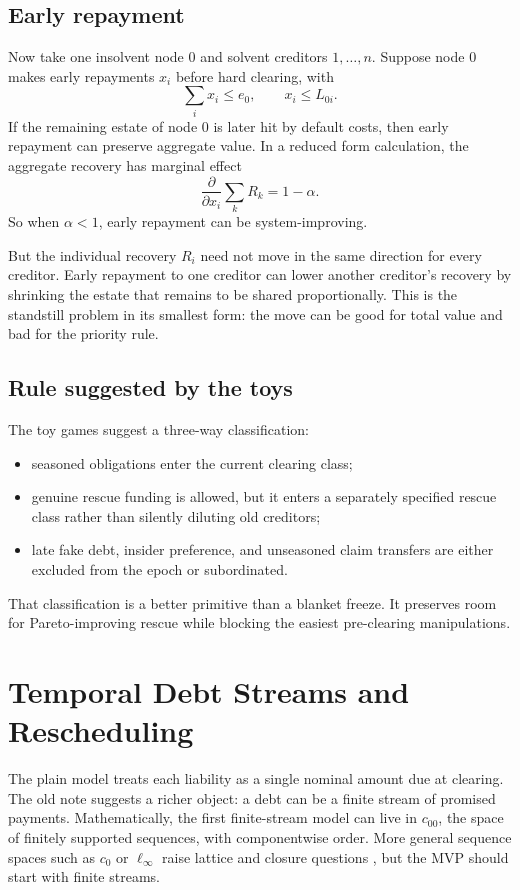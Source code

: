 \documentclass[11pt,oneside]{article}
\begin{document}
\subsection{Early repayment}

Now take one insolvent node $0$ and solvent creditors $1,\ldots,n$. Suppose
node $0$ makes early repayments $x_i$ before hard clearing, with
\[
  \sum_i x_i\leq e_0,\qquad x_i\leq L_{0i}.
\]
If the remaining estate of node $0$ is later hit by default costs, then early
repayment can preserve aggregate value. In a reduced form calculation, the
aggregate recovery has marginal effect
\[
  \frac{\partial}{\partial x_i}\sum_k R_k = 1-\alpha.
\]
So when $\alpha<1$, early repayment can be system-improving.

But the individual recovery $R_i$ need not move in the same direction for every
creditor. Early repayment to one creditor can lower another creditor's recovery
by shrinking the estate that remains to be shared proportionally. This is the
standstill problem in its smallest form: the move can be good for total value
and bad for the priority rule.

\subsection{Rule suggested by the toys}

The toy games suggest a three-way classification:

\begin{itemize}[leftmargin=1.5em]
  \item seasoned obligations enter the current clearing class;
  \item genuine rescue funding is allowed, but it enters a separately specified
  rescue class rather than silently diluting old creditors;
  \item late fake debt, insider preference, and unseasoned claim transfers are
  either excluded from the epoch or subordinated.
\end{itemize}

That classification is a better primitive than a blanket freeze. It preserves
room for Pareto-improving rescue while blocking the easiest pre-clearing
manipulations.

\section{Temporal Debt Streams and Rescheduling}

The plain model treats each liability as a single nominal amount due at
clearing. The old note suggests a richer object: a debt can be a finite stream
of promised payments. Mathematically, the first finite-stream model can live in
$c_{00}$, the space of finitely supported sequences, with componentwise order.
More general sequence spaces such as $c_0$ or $\ell_\infty$ raise lattice and
closure questions \cite[chapter 16]{aliprantis}, but the MVP should start with
finite streams.
\end{document}

